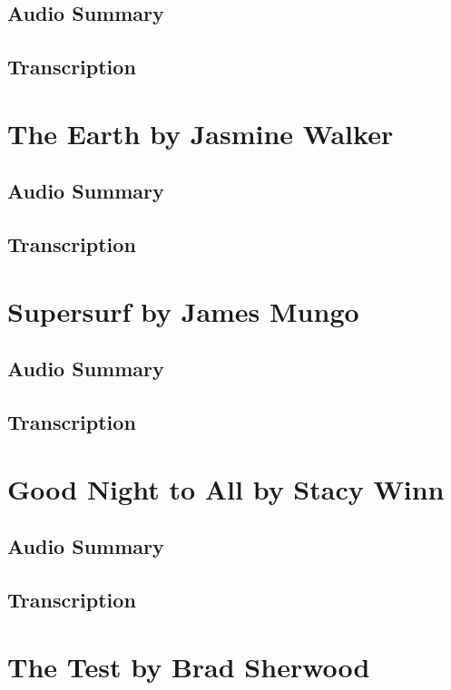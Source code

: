 \subsection{Audio Summary}

\subsection{Transcription}

\section{The Earth by Jasmine Walker}

\subsection{Audio Summary}

\subsection{Transcription}

\section{Supersurf by James Mungo}

\subsection{Audio Summary}

\subsection{Transcription}

\section{Good Night to All by Stacy Winn}

\subsection{Audio Summary}

\subsection{Transcription}

\section{The Test by Brad Sherwood}

